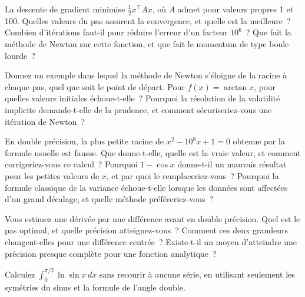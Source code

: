 \begin{question}\label{iq:iv1:calculus-and-optimisation:10}
La descente de gradient minimise $\frac12 x^\top Ax$, où $A$ admet pour valeurs propres 1 et 100. Quelles valeurs du pas assurent la convergence, et quelle est la meilleure~? Combien d'itérations faut-il pour réduire l'erreur d'un facteur $10^6$~? Que fait la méthode de Newton sur cette fonction, et que fait le momentum de type boule lourde~?
\end{question}

\begin{question}\label{iq:iv1:calculus-and-optimisation:11}
Donnez un exemple dans lequel la méthode de Newton s'éloigne de la racine à chaque pas, quel que soit le point de départ. Pour $f(x) = \arctan x$, pour quelles valeurs initiales échoue-t-elle~? Pourquoi la résolution de la volatilité implicite demande-t-elle de la prudence, et comment sécuriseriez-vous une itération de Newton~?
\end{question}

\begin{question}\label{iq:iv1:calculus-and-optimisation:12}
En double précision, la plus petite racine de $x^2 - 10^8x + 1 = 0$ obtenue par la formule usuelle est fausse. Que donne-t-elle, quelle est la vraie valeur, et comment corrigeriez-vous ce calcul~? Pourquoi $1 - \cos x$ donne-t-il un mauvais résultat pour les petites valeurs de $x$, et par quoi le remplaceriez-vous~? Pourquoi la formule classique de la variance échoue-t-elle lorsque les données sont affectées d'un grand décalage, et quelle méthode préféreriez-vous~?
\end{question}

\begin{question}\label{iq:iv1:calculus-and-optimisation:13}
Vous estimez une dérivée par une différence avant en double précision. Quel est le pas optimal, et quelle précision atteignez-vous~? Comment ces deux grandeurs changent-elles pour une différence centrée~? Existe-t-il un moyen d'atteindre une précision presque complète pour une fonction analytique~?
\end{question}

\begin{question}\label{iq:iv1:calculus-and-optimisation:14}
Calculez $\int_0^{\pi/2} \ln \sin x\,dx$ sans recourir à aucune série, en utilisant seulement les symétries du sinus et la formule de l'angle double.
\end{question}

